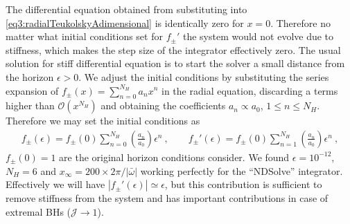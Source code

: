 The differential equation obtained from substituting  into \eqref{eq3:radialTeukolskyAdimensional} is identically zero for $x=0$.
Therefore no matter what initial conditions set for $f_{\pm}{\!}'$ the system would not evolve due to stiffness, which makes the step size of the integrator effectively zero.
The usual solution for stiff differential equation is to start the solver a small distance from the horizon $\epsilon>0$.
We adjust the initial conditions by substituting the series expansion of $f_{\pm}(x) = \sum_{n=0}^{N_H} a_n x^n$ in the radial equation, discarding a terms higher than $\mathscr{O}(x^{N_H})$ and obtaining the coefficients $a_n \propto a_0$, $1 \le n \le N_H$. 
Therefore we may set the initial conditions as
\begin{align}
	f_{\pm}(\epsilon) = f_{\pm}(0) \sum_{n=0}^{N_H} \left(\frac{a_n}{a_0}\right) \epsilon^n ~,\qquad f_{\pm}{\!}'(\epsilon) = f_{\pm}(0) \sum_{n=1}^{N_H} \left(\frac{a_n}{a_0}\right) \epsilon^n ~,
\end{align}
$f_{\pm}(0)=1$ are the original horizon conditions consider.
We found $\epsilon=10^{-12}$, $N_H=6$ and $x_\infty = 200 \times 2\pi/|\bar{\omega}|$ working perfectly for the ``NDSolve'' integrator.
Effectively we will have $|f_{\pm}{\!}'(\epsilon)|\simeq \epsilon$, but this contribution is sufficient to remove stiffness from the system and has important contributions in case of extremal BHs ($\mathscr{J}\to 1$).

